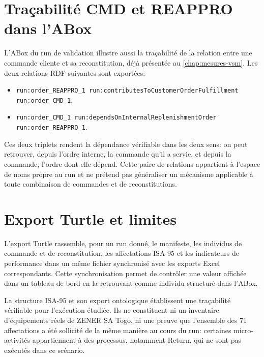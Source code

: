 \section{Traçabilité CMD et REAPPRO dans l'ABox}

L'ABox du run de validation illustre aussi la traçabilité de la relation entre une commande cliente et sa reconstitution, déjà présentée au \cref{chap:mesures-vsm}. Les deux relations RDF suivantes sont exportées:

\begin{itemize}
  \item {\small\texttt{run:order\_REAPPRO\_1 run:contributesToCustomerOrderFulfillment run:order\_CMD\_1}};
  \item {\small\texttt{run:order\_CMD\_1 run:dependsOnInternalReplenishmentOrder run:order\_REAPPRO\_1}}.
\end{itemize}

Ces deux triplets rendent la dépendance vérifiable dans les deux sens: on peut retrouver, depuis l'ordre interne, la commande qu'il a servie, et depuis la commande, l'ordre dont elle dépend. Cette paire de relations appartient à l'espace de noms propre au run et ne prétend pas généraliser un mécanisme applicable à toute combinaison de commandes et de reconstitutions.


\section{Export Turtle et limites}

L'export Turtle rassemble, pour un run donné, le manifeste, les individus de commande et de reconstitution, les affectations ISA-95 et les indicateurs de performance dans un même fichier synchronisé avec les exports Excel correspondants. Cette synchronisation permet de contrôler une valeur affichée dans un tableau de bord en la retrouvant comme individu structuré dans l'ABox.

La structure ISA-95 et son export ontologique établissent une traçabilité vérifiable pour l'exécution étudiée. Ils ne constituent ni un inventaire d'équipements réels de ZENER SA Togo, ni une preuve que l'ensemble des 71 affectations a été sollicité de la même manière au cours du run: certaines micro-activités appartiennent à des processus, notamment Return, qui ne sont pas exécutés dans ce scénario.
